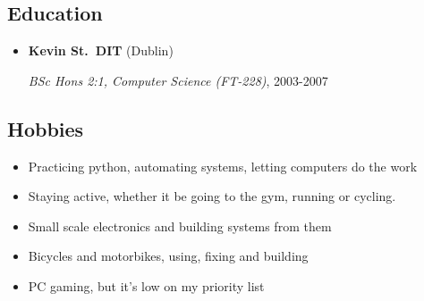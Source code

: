 \documentclass[]{article}
\begin{document}
\subsection{Education}\label{education}

\begin{itemize}
\item
  \textbf{Kevin St.~DIT} (Dublin)

  \emph{BSc Hons 2:1, Computer Science (FT-228)}, 2003-2007
\end{itemize}

\subsection{Hobbies}\label{hobbies}

\begin{itemize}
\item
  Practicing python, automating systems, letting computers do the work
\item
  Staying active, whether it be going to the gym, running or cycling.
\item
  Small scale electronics and building systems from them
\item
  Bicycles and motorbikes, using, fixing and building
\item
  PC gaming, but it's low on my priority list
\end{itemize}
\end{document}
